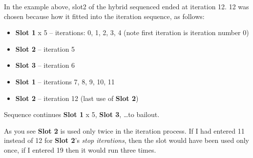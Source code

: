 In the example above, slot2 of the hybrid sequenced ended at iteration 12. 12
was chosen because how it fitted into the iteration sequence, as follows:

\begin{itemize}
\item \textbf{Slot 1} x 5 -- iterations: 0, 1, 2, 3, 4 (note first iteration is iteration number 0)
\item \textbf{Slot 2} -- iteration 5
\item \textbf{Slot 3} -- iteration 6
\item \textbf{Slot 1} -- iterations 7, 8, 9, 10, 11
\item \textbf{Slot 2} -- iteration 12 (last use of \textbf{Slot 2})
\end{itemize}

Sequence continues \textbf{Slot 1} x 5, \textbf{Slot 3}, \ldots to bailout.

As you see \textbf{Slot 2} is used only twice in the iteration process. If I had entered 11 instead of 12 for \textbf{Slot 2}'s \emph{stop iterations}, then the slot would have been used only once, if I entered 19 then it would run three times.

